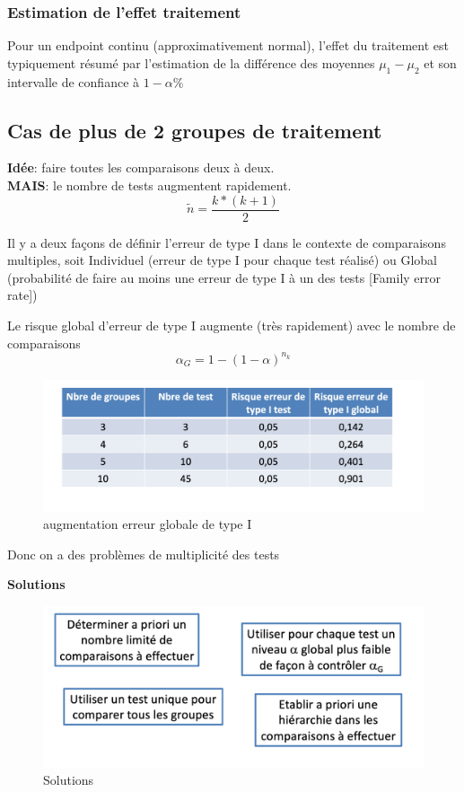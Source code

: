 \subsubsection{Estimation de l'effet traitement}
Pour un endpoint continu (approximativement normal), l’effet du traitement est typiquement résumé par l’estimation de la différence des moyennes $\mu_{1}-\mu_{2}$  et son intervalle de confiance à $1 − \alpha \%$
\subsection{Cas de plus de 2 groupes de traitement}
\textbf{Idée}: faire toutes les comparaisons deux à deux.\\ 

\textbf{MAIS}: le nombre de tests augmentent rapidement.
$$\tilde{n} = \frac{k*(k+1)}{2}$$

Il y a deux façons de définir l’erreur de type I dans le contexte de comparaisons multiples, soit Individuel (erreur de type I pour chaque test réalisé) ou Global (probabilité de faire au moins une erreur de
type I à un des tests [Family error rate])

Le risque global d’erreur de type I augmente (très rapidement) avec le nombre de comparaisons\\

$$\alpha_{G}=1-(1-\alpha)^{n_{k}}$$

\begin{figure}[H]
    \centering
    \includegraphics[scale = 0.5]{images/erreurglobal.png}
    \caption{augmentation erreur globale de type I}
    \label{fig:my_label}
\end{figure}

\begin{center}
    Donc on a des problèmes de multiplicité des tests
\end{center}

\textbf{Solutions}

\begin{figure}[H]
    \centering
    \includegraphics[scale = 0.5]{images/problememultitest.png}
    \caption{Solutions}
    \label{fig:my_label}
\end{figure}

